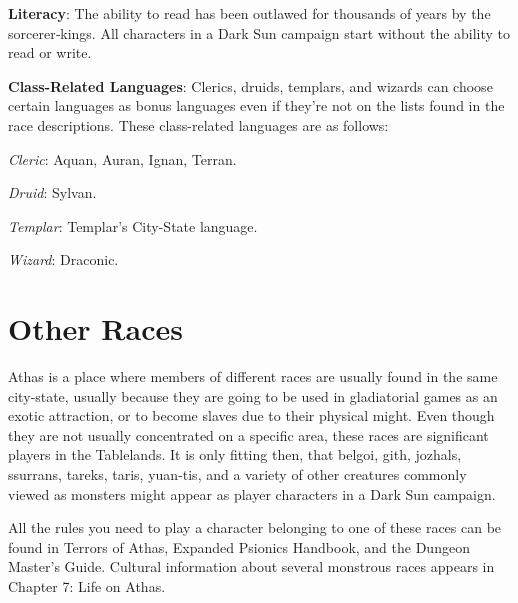 \textbf{Literacy}: The ability to read has been outlawed for thousands of years by the sorcerer‐kings. All characters in a Dark Sun campaign start without the ability to read or write.

\textbf{Class-Related Languages}: Clerics, druids, templars, and wizards can choose certain languages as bonus languages even if they're not on the lists found in the race descriptions. These class-related languages are as follows:

\textit{Cleric}: Aquan, Auran, Ignan, Terran.

\textit{Druid}: Sylvan.

\textit{Templar}: Templar's City-State language.

\textit{Wizard}: Draconic.











\section{Other Races}
Athas is a place where members of different races are usually found in the same city‐state, usually because they are going to be used in gladiatorial games as an exotic attraction, or to become slaves due to their physical might. Even though they are not usually concentrated on a specific area, these races are significant players in the Tablelands. It is only fitting then, that belgoi, gith, jozhals, ssurrans, tareks, taris, yuan‐tis, and a variety of other creatures commonly viewed as monsters might appear as player characters in a Dark Sun campaign.

All the rules you need to play a character belonging to one of these races can be found in Terrors of Athas, Expanded Psionics Handbook, and the Dungeon Master's Guide. Cultural information about several monstrous races appears in Chapter 7: Life on Athas.


